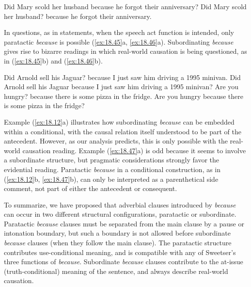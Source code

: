 \ea \label{ex:18.44}
\ea  Did Mary scold her husband because he forgot their anniversary?
\ex Did Mary scold her husband? because he forgot their anniversary.
                       \z
\z

\begin{sloppypar}
In questions, as in statements, when the speech act function is intended, only paratactic \textit{because} is possible (\ref{ex:18.45}a, \ref{ex:18.46}a). Subordinating \textit{because} gives rise to bizarre readings in which real-world causation is being questioned, as in (\ref{ex:18.45}b) and (\ref{ex:18.46}b).
\end{sloppypar}

\ea \label{ex:18.45}
\ea  Did Arnold sell his Jaguar? because I just saw him driving a 1995 minivan.
\ex Did Arnold sell his Jaguar because I just saw him driving a 1995 minivan?
                       \z
\ex \label{ex:18.46}
\ea  Are you hungry? because there is some pizza in the fridge.
\ex Are you hungry because there is some pizza in the fridge?
                       \z
\z


Example (\ref{ex:18.12}a) illustrates how subordinating \textit{because} can be embedded within a conditional, with the causal relation itself understood to be part of the antecedent. However, as our analysis predicts, this is only possible with the real-world causation reading. Example (\ref{ex:18.47}a) is odd because it seems to involve a subordinate structure, but pragmatic considerations strongly favor the evidential reading. Paratactic \textit{because} in a conditional construction, as in (\ref{ex:18.12}b, \ref{ex:18.47}b), can only be interpreted as a parenthetical side comment, not part of either the antecedent or consequent.


\ea \label{ex:18.12}
\z 
\ex \label{ex:18.47}
\z \z\largerpage


To summarize, we have proposed that adverbial clauses introduced by \textit{because} can occur in two different structural configurations, paratactic or subordinate. Paratactic \textit{because} clauses must be separated from the main clause by a pause or intonation boundary, but such a boundary is not allowed before subordinate \textit{because} clauses (when they follow the main clause). The paratactic structure contributes use-conditional meaning, and is compatible with any of Sweetser’s three functions of \textit{because}. Subordinate \textit{because} clauses contribute to the at-issue (truth-conditional) meaning of the sentence, and always describe real-world causation.





